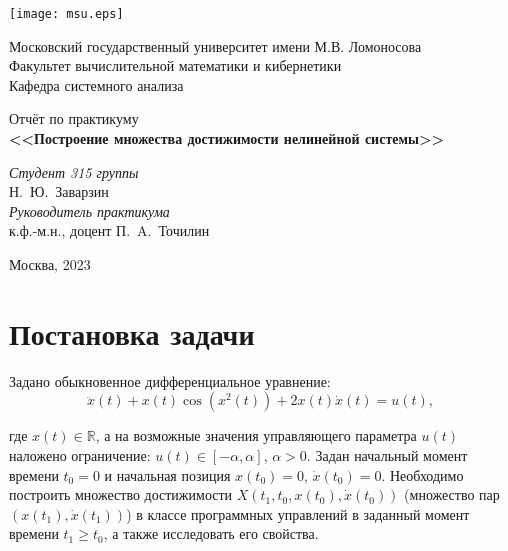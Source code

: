 \documentclass[a4paper,12pt]{article}
\begin{document}
\newcommand{\sgn}{\mathrm{sgn}}

\begin{titlepage}
\begin{center}
\texttt{[image: msu.eps]}
\end{center}

\begin{center}
Московский государственный университет имени М.В. Ломоносова\\
\vspace{0.2cm}
Факультет вычислительной математики и кибернетики\\
\vspace{0.2cm}
Кафедра системного анализа

\vspace{4cm}
{\LARGE Отчёт по практикуму}\\
\vspace{1cm}
{\Huge\bfseries <<Построение множества достижимости нелинейной системы>>}
\end{center}

\vspace{2cm}
\begin{flushright}
\large
\textit{Студент 315 группы}\\
Н.~Ю.~Заварзин\\
\vspace{5mm}
\textit{Руководитель практикума}\\
к.ф.-м.н., доцент П.~A.~Точилин\\
\end{flushright}
\vspace{4.5cm}

\begin{center}
Москва, 2023
\end{center}
\end{titlepage} 

\newpage

\tableofcontents

\newpage
\section{Постановка задачи}
Задано обыкновенное дифференциальное уравнение:
\begin{equation} \label{eq1}
	\ddot{x}(t) + x(t)\cos(x^2(t)) + 2x(t)\dot{x}(t) = u(t),
\end{equation}

где $x(t) \in \mathbb{R}$, а на возможные значения управляющего параметра $u(t)$ наложено ограничение: $u(t) \in [-\alpha, \alpha]$, $\alpha > 0.$ Задан начальный момент времени $t_0 = 0$ и начальная позиция $x(t_0)=0$, $\dot{x}(t_0) = 0$. Необходимо построить множество достижимости $X(t_1, t_0, x(t_0), \dot{x}(t_0))$ (множество пар $(x(t_1), \dot{x}(t_1))$) в классе программных управлений в заданный момент времени $t_1 \geqslant t_0$, а также исследовать его свойства. 
\end{document}
